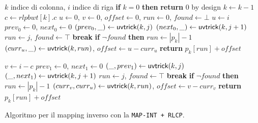 \begin{algorithm}
  \begin{algorithmic}[1]
    \Comment $k$ indice di colonna, $i$ indice di riga
    \State \textbf{if} $k=0$ \textbf{then} \textbf{return} $0$
    \Comment by design
    \State $k\gets k-1$
    \State $c\gets rlpbwt[k].c$
    \State $u\gets 0$, $v\gets 0$, $offset\gets 0$, $run \gets 0$,
    $found\gets \bot$
    \State $u\gets i$
    \State $prev_0\gets 0$, $next_0\gets 0$
    \For {\textit{every} $j\in [0,|p_k|)$}
    \State $(prev_0,\_) \gets \mbox{\rm {\sf uvtrick}}(k,j)$
    \State $(next_0,\_) \gets \mbox{\rm {\sf uvtrick}}(k,j+1)$
    \State $run\gets j$, $found\gets \top$
    \State \textbf{break}
    \EndIf
    \EndFor
    \State \textbf{if} $\neg found$ \textbf{then} $run \gets |p_k|-1$
    \State $(curr_u,\_)\gets \mbox{\rm {\sf uvtrick}}(k, run)$, $offset\gets u-curr_u$
    \State \textbf{return} $p_k[run]+offset$
    \Else

    \State $v\gets i-c$
    \State $prev_1\gets 0$, $next_1\gets 0$
    \For {\textit{every} $j\in [0,|p_k|)$}
    \State $(\_,prev_1) \gets \mbox{\rm {\sf uvtrick}}(k,j)$
    \State $(\_,next_1) \gets \mbox{\rm {\sf uvtrick}}(k,j+1)$
    \State $run\gets j$, $found\gets \top$
    \State \textbf{break}
    \EndIf
    \EndFor
    \State \textbf{if} $\neg found$ \textbf{then} $run \gets |p_k|-1$
    \State $(curr_v,curr_u)\gets \mbox{\rm {\sf uvtrick}}(k, run)$, $offset\gets v-curr_v$
    \State \textbf{return} $p_k[run]+offset$
    \EndIf
    \EndFunction
  \end{algorithmic}
  \caption{Algoritmo per il mapping inverso con la \texttt{MAP-INT + RLCP}.}
  \label{algo:lfrev}
\end{algorithm}

